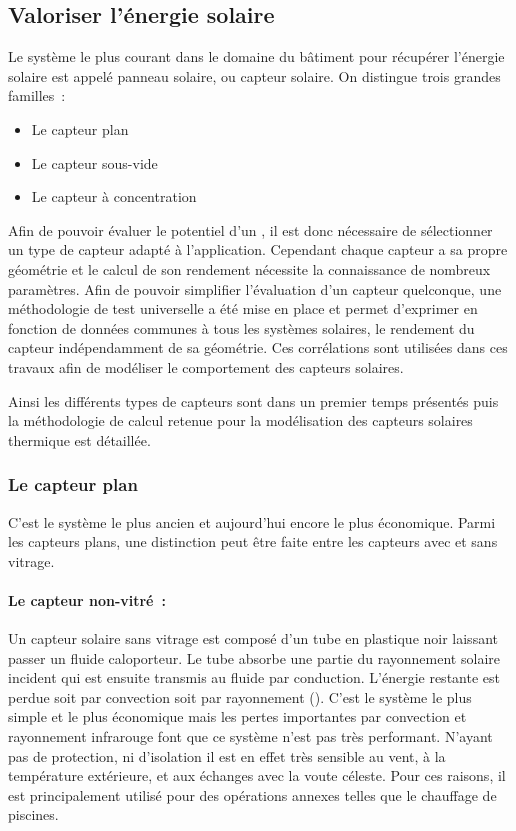 \subsection{Valoriser l’énergie solaire} %
\label{sub:valoriser_l_energie_solaire}
Le système le plus courant dans le domaine du bâtiment pour récupérer l’énergie solaire
est appelé panneau solaire, ou capteur solaire. On distingue trois grandes familles~:
\begin{itemize}
    \item Le capteur plan
    \item Le capteur sous-vide
    \item Le capteur à concentration
\end{itemize}

Afin de pouvoir évaluer le potentiel d’un , il est donc nécessaire de
sélectionner un type de capteur adapté à l’application. Cependant chaque capteur a sa
propre géométrie et le calcul de son rendement nécessite la connaissance de nombreux
paramètres. Afin de pouvoir simplifier l’évaluation d’un capteur quelconque, une
méthodologie de test universelle a été mise en place et permet d’exprimer en fonction de
données communes à tous les systèmes solaires, le rendement du capteur indépendamment de
sa géométrie. Ces corrélations sont utilisées dans ces travaux afin de
modéliser le comportement des capteurs solaires.

Ainsi les différents types de capteurs sont dans un premier temps présentés puis
la méthodologie de calcul retenue pour la modélisation des capteurs solaires
thermique est détaillée.



\subsubsection{Le capteur plan} %
\label{ssub:le_capteur_plan}
C’est le système le plus ancien et aujourd’hui encore le plus économique. Parmi les
capteurs plans, une distinction peut être faite entre les capteurs avec et sans vitrage.

\paragraph{Le capteur non-vitré~:} %
\label{par:le_capteur_non_vitre}
Un capteur solaire sans vitrage est composé d’un tube en plastique noir laissant passer un
fluide caloporteur. Le tube absorbe une partie du rayonnement solaire incident qui est
ensuite transmis au fluide par conduction. L’énergie restante est perdue soit par
convection soit par rayonnement (). C’est le système le plus
simple et le plus économique mais les pertes importantes par convection et rayonnement
infrarouge font que ce système n’est pas très performant. N’ayant pas de protection, ni
d’isolation il est en effet très sensible au vent, à la température extérieure, et aux
échanges avec la voute céleste. Pour ces raisons, il est principalement utilisé pour des
opérations annexes telles que le chauffage de piscines.

